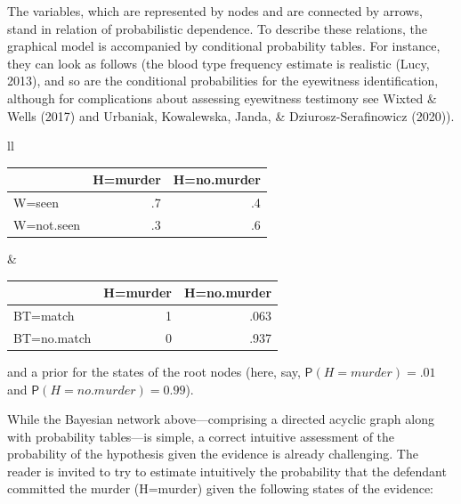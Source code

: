\documentclass[11pt,dvipsnames,enabledeprecatedfontcommands]{scrartcl}
\newcommand{\pr}[1]{\mathsf{P}(#1)}
\begin{document}
\vspace{1mm}

The variables, which are represented by nodes and are connected by
arrows, stand in relation of probabilistic dependence. To describe these
relations, the graphical model is accompanied by conditional probability
tables. For instance, they can look as follows (the blood type frequency
estimate is realistic (Lucy, 2013), and so are the conditional
probabilities for the eyewitness identification, although for
complications about assessing eyewitness testimony see Wixted \& Wells
(2017) and Urbaniak, Kowalewska, Janda, \& Dziurosz-Serafinowicz
(2020)).

\noindent

\begin{tabular}{ll}
\begin{minipage}[c]{0.45\linewidth}
\begin{table}[H]
\centering
\begin{tabular}{lrr}
\toprule
  & H=murder & H=no.murder\\
\midrule
W=seen & .7 & .4\\
W=not.seen & .3 & .6\\
\bottomrule
\end{tabular}
\end{table}
\end{minipage}& \begin{minipage}[c]{0.45\linewidth}
\begin{table}[H]
\centering
\begin{tabular}{lrr}
\toprule
  & H=murder & H=no.murder\\
\midrule
BT=match & 1 & .063\\
BT=no.match & 0 & .937\\
\bottomrule
\end{tabular}
\end{table}
\end{minipage}
\end{tabular}

\vspace{2mm}

\noindent and a prior for the states of the root nodes (here, say,
\(\pr{H=murder} = .01\) and \(\pr{H= no.murder} = 0.99\)).

While the Bayesian network above---comprising a directed acyclic graph
along with probability tables---is simple, a correct intuitive
assessment of the probability of the hypothesis given the evidence is
already challenging. The reader is invited to try to estimate
intuitively the probability that the defendant committed the murder
(H=murder) given the following states of the evidence:
\end{document}

